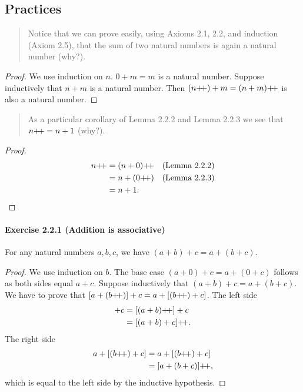 \subsection{Practices}
\begin{quote}
    Notice that we can prove easily, using Axioms 2.1, 2.2, and induction (Axiom 2.5), that the sum of two natural numbers is again a natural number (why?).
\end{quote}
\begin{proof}
    We use induction on $n$. $0+m=m$ is a natural number. Suppose inductively that $n+m$ is a natural number. Then $(n{+}{\mkern-4mu}{+}) + m = (n+m){+}{\mkern-4mu}{+}$ is also a natural number. 
\end{proof}

\begin{quote}
    As a particular corollary of Lemma 2.2.2 and Lemma 2.2.3 we see that $n{+}{\mkern-4mu}{+} = n + 1$ (why?).
\end{quote}
\begin{proof}
    \begin{align*}
        n{+}{\mkern-4mu}{+} &= (n+0){+}{\mkern-4mu}{+} && \text{(Lemma 2.2.2)}\\
        &=n + (0{+}{\mkern-4mu}{+}) && \text{(Lemma 2.2.3)}\\
        &=n + 1. &&\qedhere
    \end{align*}
\end{proof}

\paragraph{Exercise 2.2.1 (Addition is associative)} For any natural numbers $a,b,c$, we have $(a+b)+c=a+(b+c)$.
\begin{proof}
    We use induction on $b$. The base case $(a+0)+c=a+(0+c)$ follows as both sides equal $a+c$. Suppose inductively that $(a+b)+c=a+(b+c)$. We have to prove that $[a+(b{+}{\mkern-4mu}{+})]+c=a+[(b{+}{\mkern-4mu}{+})+c]$. The left side 
\begin{align*}
    [a+(b\inc)]+c&= [(a+b)\inc]+c\\
    &= [(a+b)+c]\inc.
\end{align*}
The right side
\begin{align*}
    a+[(b{+}{\mkern-4mu}{+})+c]&= a+[(b{+}{\mkern-4mu}{+})+c]\\
    &= [a+(b+c)]{+}{\mkern-4mu}{+},
\end{align*}
    which is equal to the left side by the inductive hypothesis.
\end{proof}

